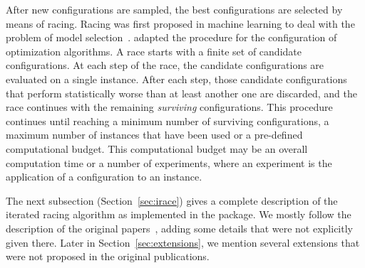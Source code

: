 \documentclass[article,a4paper,nojss,notitle]{jss}
\newcommand{\irace}{\pkg{irace}\xspace}
\newcommand{\FRACE}{\text{F-Race}\xspace}
\newcommand{\IFRACE}{\text{I/F-Race}\xspace}
\begin{document}
After new configurations are sampled, the best configurations are
selected by means of racing. Racing was first proposed in machine
learning to deal with the problem of model
selection~\citep{MarMoo1997air}.  \citet{BirStuPaqVar02:gecco} adapted
the procedure for the configuration of optimization algorithms. A race
starts with a finite set of candidate  configurations. At
each step of the race, the candidate configurations are evaluated on a
single instance. After each step, those candidate configurations that
perform statistically worse than at least another one are discarded,
and the race continues with the remaining \emph{surviving}
configurations. This procedure continues until reaching a minimum
number of surviving configurations, a maximum number of instances that
have been used or a pre-defined computational budget. This
computational budget may be an overall computation time or a number of
experiments, where an experiment is the application of a
configuration to an instance.

The next subsection (Section~\ref{sec:irace}) gives a complete description of the iterated
racing algorithm as implemented in the \irace package. We mostly
follow the description of the original
papers~\citep{BalBirStu07,BirYuaBal2010:emaoa}, adding some details
that were not explicitly given there. Later in
Section~\ref{sec:extensions}, we mention several extensions that were
not proposed in the original publications.




\end{document}
